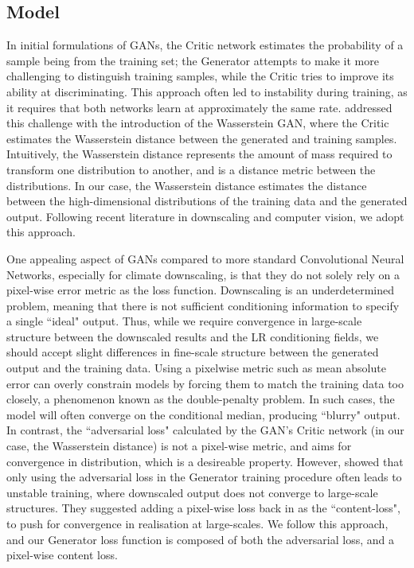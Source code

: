 \documentclass{ametsocV6.1}
\begin{document}
\subsection{Model}
In initial formulations of GANs, the Critic network estimates the probability of a sample being from the training set; the Generator attempts to make it more challenging to distinguish training samples, while the Critic tries to improve its ability at discriminating. This approach often led to instability during training, as it requires that both networks learn at approximately the same rate. \citet{arjovsky2017wasserstein} addressed this challenge with the introduction of the Wasserstein GAN, where the Critic estimates the Wasserstein distance between the generated and training samples. Intuitively, the Wasserstein distance represents the amount of mass required to transform one distribution to another, and is a distance metric between the distributions. In our case, the Wasserstein distance estimates the distance between the high-dimensional distributions of the training data and the generated output. Following recent literature in downscaling and computer vision, we adopt this approach. 

One appealing aspect of GANs compared to more standard Convolutional Neural Networks, especially for climate downscaling, is that they do not solely rely on a pixel-wise error metric as the loss function. Downscaling is an underdetermined problem, meaning that there is not sufficient conditioning information to specify a single ``ideal" output. Thus, while we require convergence in large-scale structure between the downscaled results and the LR conditioning fields, we should accept slight differences in fine-scale structure between the generated output and the training data. Using a pixelwise metric such as mean absolute error can overly constrain models by forcing them to match the training data too closely, a phenomenon known as the double-penalty problem. In such cases, the model will often converge on the conditional median, producing ``blurry" output. In contrast, the ``adversarial loss" calculated by the GAN's Critic network (in our case, the Wasserstein distance) is not a pixel-wise metric, and aims for convergence in distribution, which is a desireable property. However, \citet{wang2018esrgan} showed that only using the adversarial loss in the Generator training procedure often leads to unstable training, where downscaled output does not converge to large-scale structures. They suggested adding a pixel-wise loss back in as the ``content-loss", to push for convergence in realisation at large-scales. We follow this approach, and our Generator loss function is composed of both the adversarial loss, and a pixel-wise content loss. 
\end{document}
